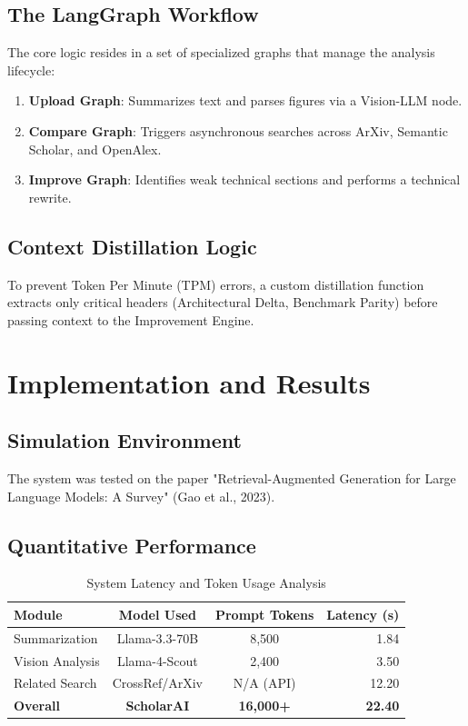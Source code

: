 \documentclass[11pt,a4paper,oneside]{report}
\begin{document}
\section{The LangGraph Workflow}
The core logic resides in a set of specialized graphs that manage the analysis lifecycle:
\begin{enumerate}
    \item \textbf{Upload Graph}: Summarizes text and parses figures via a Vision-LLM node.
    \item \textbf{Compare Graph}: Triggers asynchronous searches across ArXiv, Semantic Scholar, and OpenAlex.
    \item \textbf{Improve Graph}: Identifies weak technical sections and performs a technical rewrite.
\end{enumerate}

\section{Context Distillation Logic}
To prevent Token Per Minute (TPM) errors, a custom distillation function extracts only critical headers (Architectural Delta, Benchmark Parity) before passing context to the Improvement Engine.

\chapter{Implementation and Results}
\label{ch:results}

\section{Simulation Environment}
The system was tested on the paper "Retrieval-Augmented Generation for Large Language Models: A Survey" (Gao et al., 2023).

\section{Quantitative Performance}
\begin{table}[h!]
\centering
\begin{tabular}{@{}lccr@{}}
\toprule
\textbf{Module} & \textbf{Model Used} & \textbf{Prompt Tokens} & \textbf{Latency (s)} \\ \midrule
Summarization   & Llama-3.3-70B       & 8,500                  & 1.84                 \\
Vision Analysis & Llama-4-Scout       & 2,400                  & 3.50                 \\
Related Search  & CrossRef/ArXiv      & N/A (API)              & 12.20                \\
\textbf{Overall} & \textbf{ScholarAI}  & \textbf{16,000+}       & \textbf{22.40}       \\ \bottomrule
\end{tabular}
\caption{System Latency and Token Usage Analysis}
\label{tab:performance}
\end{table}
\end{document}
